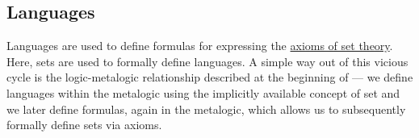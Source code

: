 \subsection{Languages}\label{subsec:languages}

\begin{remark}\label{rem:language_definitions_using_sets}
  Languages are used to define formulas for expressing the \hyperref[def:set_zfc]{axioms of set theory}. Here, sets are used to formally define languages. A simple way out of this vicious cycle is the logic-metalogic relationship described at the beginning of  --- we define languages within the metalogic using the implicitly available concept of set and we later define formulas, again in the metalogic, which allows us to subsequently formally define sets via axioms.
\end{remark}

